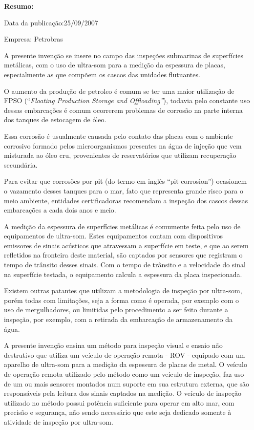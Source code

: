 \documentclass[a4paper,12pt]{article}
\begin{document}
 \textbf{Resumo:}
 
 Data da publicação:25/09/2007
 
 Empresa: Petrobras
 
 \vspace{1,0cm}
 
 A presente invenção se insere no campo das inspeções submarinas
de superfícies metálicas, com o uso de ultra-som para a medição da
espessura de placas, especialmente as que compõem os cascos das
unidades flutuantes.

O aumento da produção de petroleo é comum se ter uma maior utilização de FPSO (“\textit{Floating Production Storage and Offloading”}), todavia pelo constante uso dessas embarcações é comum ocorrerem problemas de corrosão na parte interna dos tanques de estocagem de óleo.

Essa corrosão é usualmente causada pelo contato das placas com o
ambiente corrosivo formado pelos microorganismos presentes na água de
injeção que vem misturada ao óleo cru, provenientes de reservatórios que
utilizam recuperação secundária.

Para evitar que corrosões por pit (do termo em inglês “pit
corrosion”) ocasionem o vazamento desses tanques para o mar, fato que
representa grande risco para o meio ambiente, entidades certificadoras
recomendam a inspeção dos cascos dessas embarcações a cada dois anos
e meio.

A medição da espessura de superfícies metálicas é comumente feita
pelo uso de equipamentos de ultra-som. Estes equipamentos contam com
dispositivos emissores de sinais acústicos que atravessam a superfície em
teste, e que ao serem refletidos na fronteira deste material, são captados
por sensores que registram o tempo de trânsito desses sinais. Com o tempo
de trânsito e a velocidade do sinal na superfície testada, o equipamento
calcula a espessura da placa inspecionada.

Existem outras patantes que utilizam a metodologia de inspeção por ultra-som, porém todas com limitações, seja a forma como é operada, por exemplo com o uso de mergulhadores, ou limitidas pelo procedimento a ser feito durante a inspeção, por exemplo, com a retirada da embarcação de armazenamento da água.


A presente invenção ensina um método para inspeção visual e ensaio não
destrutivo que utiliza um veículo de operação remota - ROV - equipado
com um aparelho de ultra-som para a medição da espessura de placas de
metal.
O veículo de operação remota utilizado pelo método como um veículo
de inspeção, faz uso de um ou mais sensores montados num suporte em
sua estrutura externa, que são responsáveis pela leitura dos sinais captados
na medição. O veículo de inspeção utilizado no método possui potência suficiente
para operar em alto mar, com precisão e segurança, não sendo necessário
que este seja dedicado somente à atividade de inspeção por ultra-som.
\end{document}
